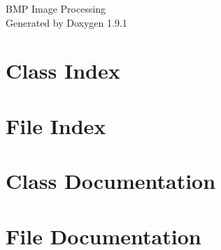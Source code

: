 \let\mypdfximage\pdfximage\def\pdfximage{\immediate\mypdfximage}\documentclass[twoside]{book}
\newcommand{\+}{\discretionary{\mbox{\scriptsize$\hookleftarrow$}}{}{}}
\newcommand{\clearemptydoublepage}{%
  \newpage{\pagestyle{empty}\cleardoublepage}%
}
\begin{document}
\raggedbottom

\hypersetup{pageanchor=false,
             bookmarksnumbered=true,
             pdfencoding=unicode
            }
\begin{titlepage}
\vspace*{7cm}
\begin{center}%
{\Large BMP Image Processing }\\
\vspace*{1cm}
{\large Generated by Doxygen 1.9.1}\\
\end{center}
\end{titlepage}
\clearemptydoublepage
{}
\tableofcontents
\clearemptydoublepage
{}
\hypersetup{pageanchor=true}

\chapter{Class Index}

\chapter{File Index}

\chapter{Class Documentation}



\chapter{File Documentation}






\backmatter
\newpage
{}
\clearemptydoublepage
{}
\printindex
\end{document}
